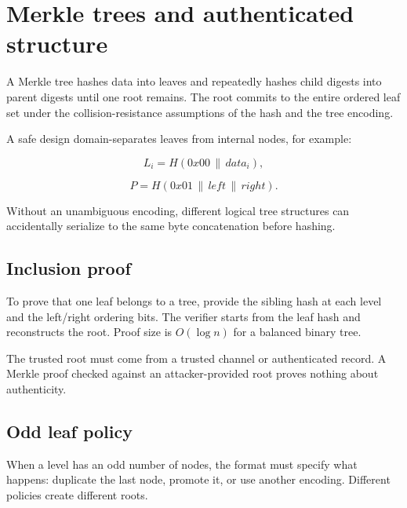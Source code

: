 \hypertarget{appendix-098192f8d46d}{}\label{referencestart:appendix-098192f8d46d}
\section{Merkle trees and authenticated structure}\label{appendix-098192f8d46d-merkle-trees-and-authenticated-structure}

\hypertarget{appendix-098192f8d46d-merkle-trees-and-authenticated-structure}{}

A Merkle tree hashes data into leaves and repeatedly hashes child digests into parent digests until one root remains. The root commits to the entire ordered leaf set under the collision-resistance assumptions of the hash and the tree encoding.

A safe design domain-separates leaves from internal nodes, for example:

\[
L_i=H(0x00\,\|\,data_i),
\]

\[
P=H(0x01\,\|\,left\,\|\,right).
\]

Without an unambiguous encoding, different logical tree structures can accidentally serialize to the same byte concatenation before hashing.

\subsection{Inclusion proof}\label{appendix-098192f8d46d-inclusion-proof}

\hypertarget{appendix-098192f8d46d-inclusion-proof}{}

To prove that one leaf belongs to a tree, provide the sibling hash at each level and the left/right ordering bits. The verifier starts from the leaf hash and reconstructs the root. Proof size is \(O(\log n)\) for a balanced binary tree.

The trusted root must come from a trusted channel or authenticated record. A Merkle proof checked against an attacker-provided root proves nothing about authenticity.

\subsection{Odd leaf policy}\label{appendix-098192f8d46d-odd-leaf-policy}

\hypertarget{appendix-098192f8d46d-odd-leaf-policy}{}

When a level has an odd number of nodes, the format must specify what happens: duplicate the last node, promote it, or use another encoding. Different policies create different roots.

